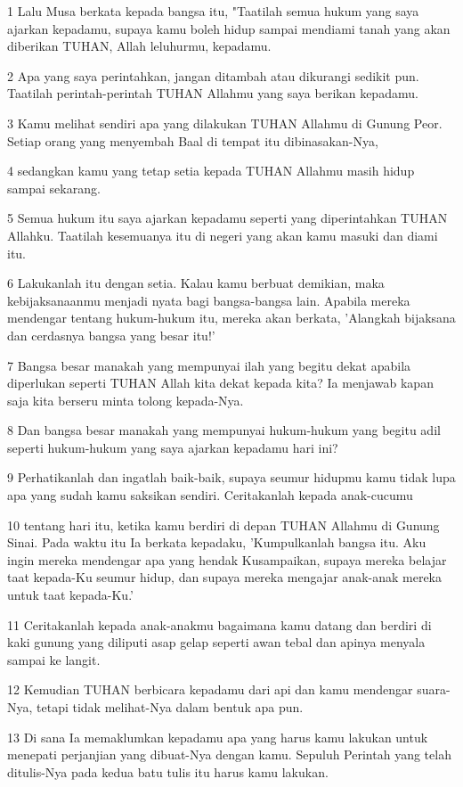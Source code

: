 \par 1 Lalu Musa berkata kepada bangsa itu, "Taatilah semua hukum yang saya ajarkan kepadamu, supaya kamu boleh hidup sampai mendiami tanah yang akan diberikan TUHAN, Allah leluhurmu, kepadamu.
\par 2 Apa yang saya perintahkan, jangan ditambah atau dikurangi sedikit pun. Taatilah perintah-perintah TUHAN Allahmu yang saya berikan kepadamu.
\par 3 Kamu melihat sendiri apa yang dilakukan TUHAN Allahmu di Gunung Peor. Setiap orang yang menyembah Baal di tempat itu dibinasakan-Nya,
\par 4 sedangkan kamu yang tetap setia kepada TUHAN Allahmu masih hidup sampai sekarang.
\par 5 Semua hukum itu saya ajarkan kepadamu seperti yang diperintahkan TUHAN Allahku. Taatilah kesemuanya itu di negeri yang akan kamu masuki dan diami itu.
\par 6 Lakukanlah itu dengan setia. Kalau kamu berbuat demikian, maka kebijaksanaanmu menjadi nyata bagi bangsa-bangsa lain. Apabila mereka mendengar tentang hukum-hukum itu, mereka akan berkata, 'Alangkah bijaksana dan cerdasnya bangsa yang besar itu!'
\par 7 Bangsa besar manakah yang mempunyai ilah yang begitu dekat apabila diperlukan seperti TUHAN Allah kita dekat kepada kita? Ia menjawab kapan saja kita berseru minta tolong kepada-Nya.
\par 8 Dan bangsa besar manakah yang mempunyai hukum-hukum yang begitu adil seperti hukum-hukum yang saya ajarkan kepadamu hari ini?
\par 9 Perhatikanlah dan ingatlah baik-baik, supaya seumur hidupmu kamu tidak lupa apa yang sudah kamu saksikan sendiri. Ceritakanlah kepada anak-cucumu
\par 10 tentang hari itu, ketika kamu berdiri di depan TUHAN Allahmu di Gunung Sinai. Pada waktu itu Ia berkata kepadaku, 'Kumpulkanlah bangsa itu. Aku ingin mereka mendengar apa yang hendak Kusampaikan, supaya mereka belajar taat kepada-Ku seumur hidup, dan supaya mereka mengajar anak-anak mereka untuk taat kepada-Ku.'
\par 11 Ceritakanlah kepada anak-anakmu bagaimana kamu datang dan berdiri di kaki gunung yang diliputi asap gelap seperti awan tebal dan apinya menyala sampai ke langit.
\par 12 Kemudian TUHAN berbicara kepadamu dari api dan kamu mendengar suara-Nya, tetapi tidak melihat-Nya dalam bentuk apa pun.
\par 13 Di sana Ia memaklumkan kepadamu apa yang harus kamu lakukan untuk menepati perjanjian yang dibuat-Nya dengan kamu. Sepuluh Perintah yang telah ditulis-Nya pada kedua batu tulis itu harus kamu lakukan.
